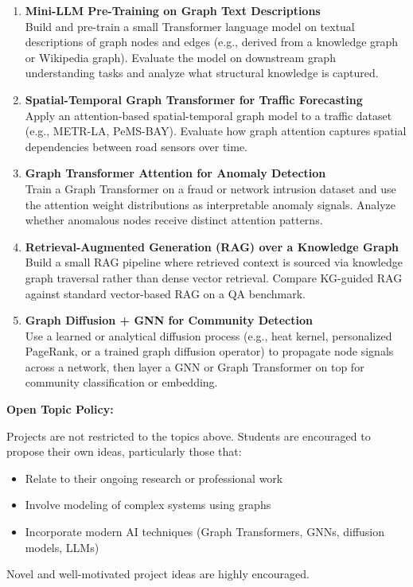 \documentclass{article}
\begin{document}
\begin{enumerate}[leftmargin=1.5em, label=\textbf{\arabic*.}]
\item \textbf{Mini-LLM Pre-Training on Graph Text Descriptions}\\
Build and pre-train a small Transformer language model on textual descriptions of graph nodes and edges (e.g., derived from a knowledge graph or Wikipedia graph). Evaluate the model on downstream graph understanding tasks and analyze what structural knowledge is captured.

\item \textbf{Spatial-Temporal Graph Transformer for Traffic Forecasting}\\
Apply an attention-based spatial-temporal graph model to a traffic dataset (e.g., METR-LA, PeMS-BAY). Evaluate how graph attention captures spatial dependencies between road sensors over time.

\item \textbf{Graph Transformer Attention for Anomaly Detection}\\
Train a Graph Transformer on a fraud or network intrusion dataset and use the attention weight distributions as interpretable anomaly signals. Analyze whether anomalous nodes receive distinct attention patterns.

\item \textbf{Retrieval-Augmented Generation (RAG) over a Knowledge Graph}\\
Build a small RAG pipeline where retrieved context is sourced via knowledge graph traversal rather than dense vector retrieval. Compare KG-guided RAG against standard vector-based RAG on a QA benchmark.

\item \textbf{Graph Diffusion + GNN for Community Detection}\\
Use a learned or analytical diffusion process (e.g., heat kernel, personalized PageRank, or a trained graph diffusion operator) to propagate node signals across a network, then layer a GNN or Graph Transformer on top for community classification or embedding.

\end{enumerate}

\vspace{0.5em}

\noindent\textbf{Open Topic Policy:}

Projects are not restricted to the topics above. Students are encouraged to propose their own ideas, particularly those that:
\begin{itemize}[leftmargin=1.5em]
    \item Relate to their ongoing research or professional work
    \item Involve modeling of complex systems using graphs
    \item Incorporate modern AI techniques (Graph Transformers, GNNs, diffusion models, LLMs)
\end{itemize}
Novel and well-motivated project ideas are highly encouraged.
\end{document}
